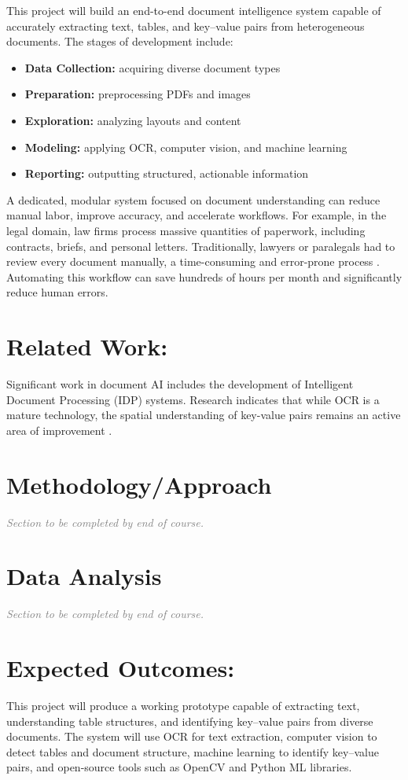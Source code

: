 \documentclass[12pt, onecolumn]{IEEEtran}
\begin{document}
This project will build an end-to-end document intelligence system capable of accurately extracting text, tables, and key–value pairs from heterogeneous documents. The stages of development include:
\begin{itemize}
    \item \textbf{Data Collection:} acquiring diverse document types
    \item \textbf{Preparation:} preprocessing PDFs and images
    \item \textbf{Exploration:} analyzing layouts and content
    \item \textbf{Modeling:} applying OCR, computer vision, and machine learning
    \item \textbf{Reporting:} outputting structured, actionable information
\end{itemize}

A dedicated, modular system focused on document understanding can reduce manual labor, improve accuracy, and accelerate workflows. For example, in the legal domain, law firms process massive quantities of paperwork, including contracts, briefs, and personal letters. Traditionally, lawyers or paralegals had to review every document manually, a time-consuming and error-prone process \cite{pfuricoh2024}. Automating this workflow can save hundreds of hours per month and significantly reduce human errors.

\section{\textbf{Related Work:}}
Significant work in document AI includes the development of Intelligent Document Processing (IDP) systems. Research indicates that while OCR is a mature technology, the spatial understanding of key-value pairs remains an active area of improvement \cite{techus2024}.

\section{\textbf{Methodology/Approach}}
\textcolor{gray}{\textit{Section to be completed by end of course.}}

\section{\textbf{Data Analysis}}
\textcolor{gray}{\textit{Section to be completed by end of course.}}

\section{\textbf{Expected Outcomes:}}
This project will produce a working prototype capable of extracting text, understanding table structures, and identifying key–value pairs from diverse documents. The system will use OCR for text extraction, computer vision to detect tables and document structure, machine learning to identify key–value pairs, and open-source tools such as OpenCV and Python ML libraries.
\end{document}
